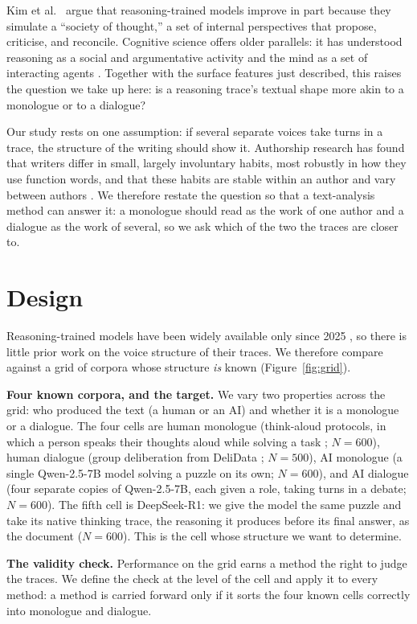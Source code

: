 \documentclass[10pt,twocolumn]{article}
\begin{document}
Kim et al.~\cite{kim2026} argue that reasoning-trained models improve in part because they simulate
a ``society of thought,'' a set of internal perspectives that propose, criticise, and reconcile.
Cognitive science offers older parallels: it has understood reasoning as a social and
argumentative activity \cite{mercier2017} and the mind as a set of interacting agents
\cite{minsky1986}. Together with the surface features just described, this raises the question we
take up here: is a reasoning trace's textual shape more akin to a monologue or to a dialogue?

Our study rests on one assumption: if several separate voices take turns in a trace, the structure of
the writing should show it. Authorship research has found that writers
differ in small, largely involuntary habits, most robustly in how they use function words, and that
these habits are stable within an author and vary between authors \cite{stamatatos2009}. We
therefore restate the question so that a text-analysis method can answer it: a monologue should read
as the work of one author and a dialogue as the work of several, so we ask which of the two the
traces are closer to.

\section{Design}
Reasoning-trained models have been widely available only since 2025 \cite{guo2025}, so there is
little prior work on the voice structure of their traces. We therefore compare against a grid
of corpora whose structure \emph{is} known (Figure~\ref{fig:grid}).

\textbf{Four known corpora, and the target.} We vary two properties across the grid: who produced
the text (a human or an AI) and whether it is a monologue or a dialogue. The four cells are human
monologue (think-aloud protocols, in which a person speaks their thoughts aloud while solving a task
\cite{wurgaft2025}; $N=600$), human dialogue (group deliberation from DeliData \cite{karadzhov2023};
$N=500$), AI monologue (a single Qwen-2.5-7B model solving a puzzle on its own; $N=600$), and AI
dialogue (four separate copies of Qwen-2.5-7B, each given a role, taking turns in a debate;
$N=600$). The fifth cell is DeepSeek-R1: we give the model the same puzzle and take its
native thinking trace, the reasoning it produces before its final answer, as the document ($N=600$).
This is the cell whose structure we want to determine.

\textbf{The validity check.} Performance on the grid earns a method the right to judge the traces.
We define the check at the level of the cell and apply it to every method: a method is carried
forward only if it sorts the four known cells correctly into monologue and dialogue.
\end{document}
